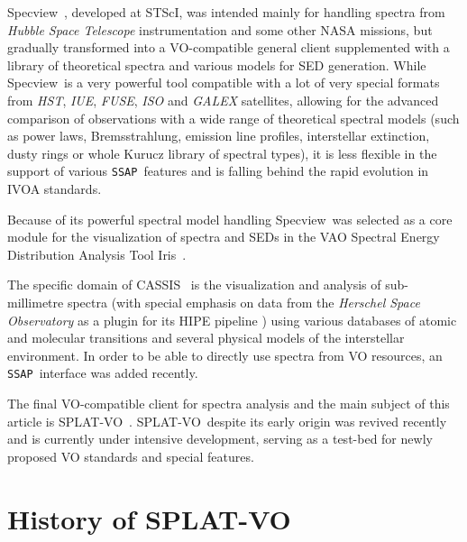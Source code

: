 \documentclass[final,authoryear,5p,times,twocolumn]{elsarticle}
\newcommand{\ssap}{\texttt{SSAP}}
\newcommand{\splatvo}{{\textsf{\small{SPLAT-VO}}}}
\newcommand{\specview}{\textsf{\small Specview}}
\newcommand{\iris}{\textsf{\small Iris}}
\newcommand{\cassis}{\textsf{\small CASSIS}}
\newcommand{\ascl}[1]{\href{http://www.ascl.net/#1}{ascl:#1}}
\begin{document}
\specview\ \citep[][\ascl{1210.016}]{2002SPIE.4847..410B}, developed at STScI,
was intended mainly for handling spectra from \emph{Hubble Space Telescope}
instrumentation and some other NASA missions, but gradually transformed into a
VO-compatible general client supplemented with a library of theoretical spectra
and various models for SED generation.  While \specview\ is a very powerful
tool compatible with a lot of very special formats from \emph{HST}, \emph{IUE},
\emph{FUSE}, \emph{ISO} and \emph{GALEX} satellites, allowing for the advanced
comparison of observations with a wide range of theoretical spectral models
(such as power laws, Bremsstrahlung, emission line profiles, interstellar
extinction, dusty rings or whole Kurucz library of spectral types), it is less
flexible in the support of various \ssap\ features and is falling behind the
rapid evolution in IVOA standards.

Because of its powerful spectral model handling \specview\   was  selected as a
core module for the visualization of spectra and SEDs in the VAO Spectral
Energy Distribution Analysis Tool \iris\
\citep[][\ascl{1205.007}]{2014ASPC..485...19L}.

The specific domain of \cassis\ \citep[][\ascl{1402.013}]{2011IAUS..280P.120C}
is the visualization and analysis of  sub-millimetre  spectra (with special
emphasis on data from the \emph{Herschel Space Observatory} as a plugin for its
HIPE pipeline \citep[][\ascl{1111.001}]{2012ASPC..461..733B}) using various
databases of atomic and molecular transitions and several physical models of
the interstellar environment. In order to be able to directly use spectra from
VO resources, an \ssap\ interface was added recently.

The final VO-compatible client for spectra analysis and the main subject of
this article is \splatvo\ \citep[][\ascl{1402.008}]{sun243}.  \splatvo\ despite
its early origin was revived recently and is currently under intensive
development, serving as a test-bed for newly proposed VO standards and special
features.

\section{History of SPLAT-VO}
%
\end{document}
